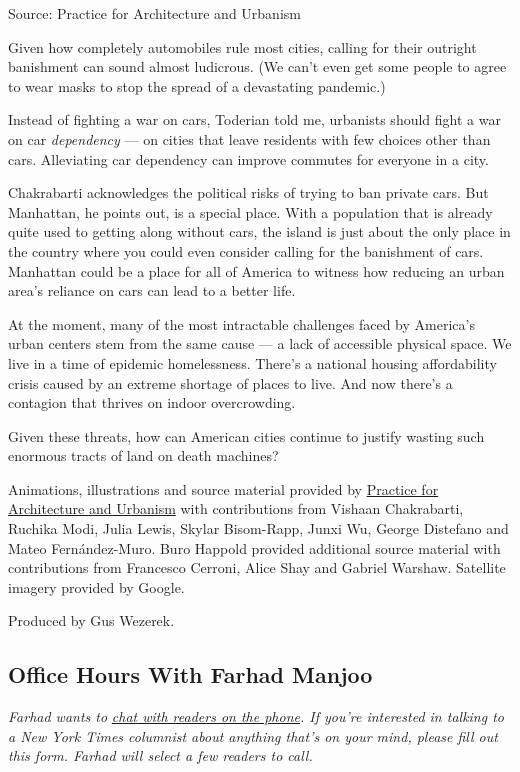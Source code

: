 Source: Practice for Architecture and Urbanism

Given how completely automobiles rule most cities, calling for their
outright banishment can sound almost ludicrous. (We can't even get some
people to agree to wear masks to stop the spread of a devastating
pandemic.)

Instead of fighting a war on cars, Toderian told me, urbanists should
fight a war on car \emph{dependency} --- on cities that leave residents
with few choices other than cars. Alleviating car dependency can improve
commutes for everyone in a city.

Chakrabarti acknowledges the political risks of trying to ban private
cars. But Manhattan, he points out, is a special place. With a
population that is already quite used to getting along without cars, the
island is just about the only place in the country where you could even
consider calling for the banishment of cars. Manhattan could be a place
for all of America to witness how reducing an urban area's reliance on
cars can lead to a better life.

At the moment, many of the most intractable challenges faced by
America's urban centers stem from the same cause --- a lack of
accessible physical space. We live in a time of epidemic homelessness.
There's a national housing affordability crisis caused by an extreme
shortage of places to live. And now there's a contagion that thrives on
indoor overcrowding.

Given these threats, how can American cities continue to justify wasting
such enormous tracts of land on death machines?

Animations, illustrations and source material provided by
\href{http://pau.studio/}{Practice for Architecture and Urbanism} with
contributions from Vishaan Chakrabarti, Ruchika Modi, Julia Lewis,
Skylar Bisom-Rapp, Junxi Wu, George Distefano and Mateo Fernández-Muro.
Buro Happold provided additional source material with contributions from
Francesco Cerroni, Alice Shay and Gabriel Warshaw. Satellite imagery
provided by Google.

Produced by Gus Wezerek.

\hypertarget{office-hours-with-farhad-manjoo}{%
\subsection{Office Hours With Farhad
Manjoo}\label{office-hours-with-farhad-manjoo}}

\emph{Farhad wants to}
\href{https://www.nytimes.com/2019/05/16/opinion/farhad-office-hours.html?module=inline}{\emph{chat
with readers on the phone}}\emph{. If you're interested in talking to a
New York Times columnist about anything that's on your mind, please fill
out this form. Farhad will select a few readers to call.}

